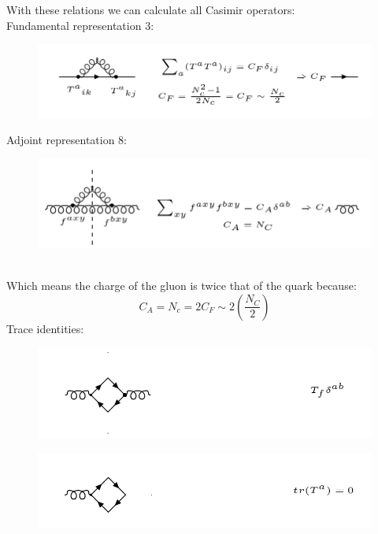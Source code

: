With these relations we can calculate all Casimir operators:\\
Fundamental representation 3:\\
\begin{figure}[h!]
\centering
\includegraphics[scale=0.6]{images/Intro/Casimir1.png}
\end{figure}
Adjoint representation 8:\\
\begin{figure}[h!]
\centering
\includegraphics[scale=0.6]{images/Intro/Casimir2.png}
\end{figure}
\pagebreak
\\
Which means the charge of the gluon is twice that of the quark because:
\begin{equation}
 C_A = N_c =2C_F \sim 2(\frac{N_C}{2}) 
\end{equation}
Trace identities:\\
\begin{figure}[h!]
\centering
\includegraphics[scale=0.6]{images/Intro/Casimir3.png}
\end{figure}
\begin{figure}[h!]
\centering
\includegraphics[scale=0.6]{images/Intro/Casimir4.png}
\end{figure}


